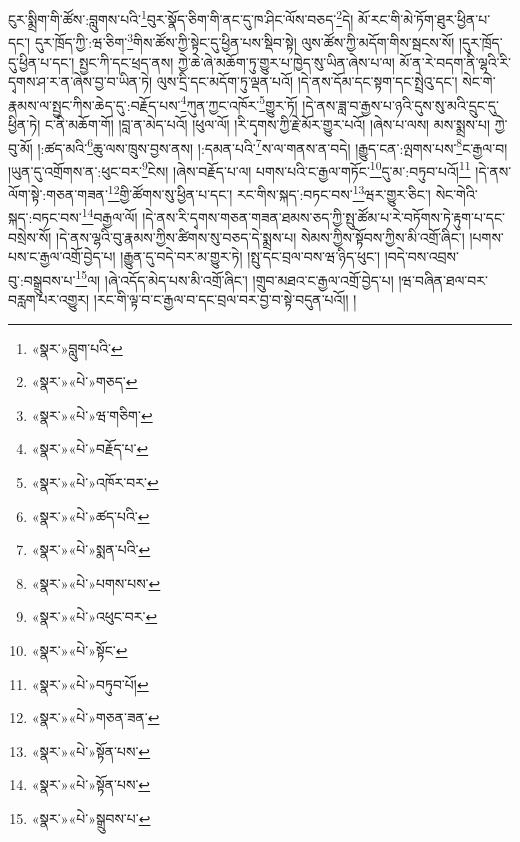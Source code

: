 ངུར་སྨྲིག་གི་ཚོས་:བླུགས་པའི་\footnote{«སྣར་»བླུག་པའི་}བུར་སྣོད་ཅིག་གི་ནང་དུ་ཁ་ཤིང་ལོས་བཅད་\footnote{«སྣར་»«པེ་»གཅད་}དེ། མོ་རང་གི་མེ་ཏོག་ཐུར་ཕྱིན་པ་དང་། དུར་ཁྲོད་ཀྱི་:ཝ་ཅིག་\footnote{«སྣར་»«པེ་»ཝ་གཅིག་}གིས་ཚོས་ཀྱི་སྟེང་དུ་ཕྱིན་པས་སྡིབ་སྟེ། ལུས་ཚོས་ཀྱི་མདོག་གིས་སྦངས་སོ། །དུར་ཁྲོད་དུ་ཕྱིན་པ་དང་། སྤྱང་ཀི་དང་ཕྲད་ནས། ཀྱེ་ཆེ་ཞེ་མཆོག་ཏུ་གྱུར་པ་ཁྱེད་སུ་ཡིན་ཞེས་པ་ལ། མོ་ན་རེ་བདག་ནི་ལྷའི་རི་དྭགས་ཤ་ར་ན་ཞེས་བྱ་བ་ཡིན་ཏེ། ལུས་དྲི་དང་མདོག་ཏུ་ལྡན་པའོ། །དེ་ནས་དོམ་དང་སྟག་དང་སྤྲེའུ་དང་། སེང་གེ་རྣམས་ལ་སྤྱང་ཀིས་ཆེད་དུ་:བརྗོད་པས་\footnote{«སྣར་»«པེ་»བརྗོད་པ་}ཀུན་ཀྱང་འཁོར་\footnote{«སྣར་»«པེ་»འཁོར་བར་}གྱུར་ཏོ། །དེ་ནས་ཟླ་བ་རྒྱས་པ་ཉའི་དུས་སུ་མའི་དྲུང་དུ་ཕྱིན་ཏེ། ང་ནི་མཆོག་གོ། །བླ་ན་མེད་པའོ། །ཕུལ་ལོ། །རི་དྭགས་ཀྱི་རྗེ་མོར་གྱུར་པའོ། །ཞེས་པ་ལས། མས་སྨྲས་པ། ཀྱེ་བུ་མོ། །:ཚད་མའི་\footnote{«སྣར་»«པེ་»ཚད་པའི་}ཆུ་ལས་ཁྲུས་བྱས་ནས། །:དམན་པའི་\footnote{«སྣར་»«པེ་»སྨན་པའི་}ས་ལ་གནས་ན་བདེ། །རྒྱུད་ངན་:ལྤགས་པས་\footnote{«སྣར་»«པེ་»པགས་པས་}ང་རྒྱལ་བ། །ཡུན་དུ་འགྲོགས་ན་:ཕུང་བར་\footnote{«སྣར་»«པེ་»འཕུང་བར་}ངེས། །ཞེས་བརྗོད་པ་ལ། པགས་པའི་ང་རྒྱལ་གཏོང་\footnote{«སྣར་»«པེ་»སྟོང་}དུ་མ་:བཏུབ་པའོ།\footnote{«སྣར་»«པེ་»བཏུབ་པོ།} །དེ་ནས་ལོག་སྟེ་:གཅན་གཟན་\footnote{«སྣར་»«པེ་»གཅན་ཟན་}གྱི་ཚོགས་སུ་ཕྱིན་པ་དང་། རང་གིས་སྐད་:བཏང་བས་\footnote{«སྣར་»«པེ་»སྟོན་པས་}ཝར་གྱུར་ཅིང་། སེང་གེའི་སྐད་:བཏང་བས་\footnote{«སྣར་»«པེ་»སྟོན་པས་}བརྒྱལ་ལོ། །དེ་ནས་རི་དྭགས་གཅན་གཟན་ཐམས་ཅད་ཀྱི་སྤུ་ཚོམ་པ་རེ་བཏོགས་ཏེ་རྟུག་པ་དང་བསྲེས་སོ། །དེ་ནས་ལྷའི་བུ་རྣམས་ཀྱིས་ཚིགས་སུ་བཅད་དེ་སྨྲས་པ། སེམས་ཀྱིས་སྟོབས་ཀྱིས་མི་འགྲོ་ཞིང་། །པགས་པས་ང་རྒྱལ་འགྲོ་བྱེད་པ། །རྒྱུན་དུ་བདེ་བར་མ་གྱུར་ཏེ། །སྤུ་དང་བྲལ་བས་ཝ་ཉིད་ཕུང་། །བདེ་བས་འབྲས་བུ་:བསྒྲུབས་པ་\footnote{«སྣར་»«པེ་»སྒྲུབས་པ་}ལ། །ཞེ་འདོད་མེད་པས་མི་འགྲོ་ཞིང་། །གྲུབ་མཐའ་ང་རྒྱལ་འགྲོ་བྱེད་པ། །ཝ་བཞིན་ཐལ་བར་བརླག་པར་འགྱུར། །རང་གི་ལྟ་བ་ང་རྒྱལ་བ་དང་བྲལ་བར་བྱ་བ་སྟེ་བདུན་པའོ།། །
